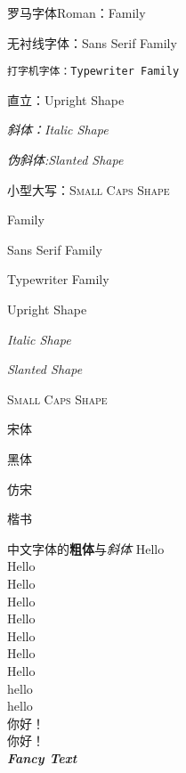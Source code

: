 \documentclass[12pt]{article}
\newcommand{\myfont}{\textit{\textbf{\textsf{Fancy Text}}}}
\begin{document}
	\textrm{罗马字体Roman：Family}
	
	\textsf{无衬线字体：Sans Serif Family}
	
	\texttt{打字机字体：Typewriter Family}
	
	\textup{直立：Upright Shape}
	
	\textit{斜体：Italic Shape}
	
	\textsl{伪斜体:Slanted Shape}
	
	\textsc{小型大写：Small Caps Shape}
	
	 Family
	
	\sffamily Sans Serif Family
	
	\ttfamily Typewriter Family
	
	{\upshape Upright Shape}
	
	{\itshape Italic Shape}
	
	{\slshape Slanted Shape}
	
	{\scshape Small Caps Shape}
	
	{\songti 宋体}
	
	{\heiti 黑体}
	
	{\fangsong 仿宋}
	
	{\kaishu 楷书}
	
	中文字体的\textbf{粗体}与\textit{斜体} 
	{\tiny Hello}\\
	{\scriptsize Hello}\\
    {\normalsize Hello}\\%
    {\small Hello}\\
    {\normalsize Hello}\\
    {\large Hello}\\
    {\Large Hello}\\
    {\LARGE Hello}\\
    {\huge hello}\\
    {\Huge hello}\\
	
    你好！\\
    你好！\\
    \myfont
\end{document}
